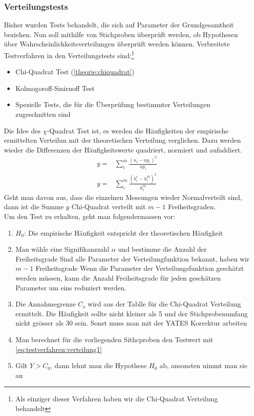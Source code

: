\subsubsection{Verteilungstests}
Bisher wurden Tests behandelt, die sich auf Parameter der Grundgesamtheit beziehen. Nun soll mithilfe von Stichproben überprüft werden, ob Hypothesen über Wahrscheinlichkeitsverteilungen überprüft werden können. Verbreitete Testverfahren in den Verteilungstests sind:\footnote{Als einziger dieser Verfahren haben wir die Chi-Quadrat Verteilung behandelt}
\begin{itemize}
\item Chi-Quadrat Test (\autoref{theorie:chiquadrat})
\item Kolmogoroff-Smirnoff Test
\item Spezielle Tests, die für die Überprüfung bestimmter Verteilungen zugeschnitten sind
\end{itemize}
Die Idee des $\chi$-Quadrat Test ist, es werden die Häufigkeiten der empirische ermittelten Verteilun mit der theoretischen Verteilung verglichen. Dazu werden wieder die Differenzen der Häufigkeitswerte quadriert, normiert und aufaddiert.
\begin{align}\label{eq:testverfahren:verteilung1}
y=&\sum_i^m \frac{\left(n_i - np_i\right)^2}{np_i}\\
y=&\sum_i^m \frac{\left(h_i^e-h_i^{th}\right)^2}{h_i^{th}}
\end{align}
Geht man davon aus, dass die einzelnen Messungen wieder Normalverteilt sind, dann ist die Summe $y$ Chi-Quadrat verteilt mit $m-1$ Freiheitsgraden.\\
Um den Test zu erhalten, geht man folgendermassen vor:
\begin{enumerate}
\item $H_0$: Die empirische Häufigkeit entspricht der theoretischen Häufigkeit
\item Man wähle eine Signifikanzzahl $\alpha$ und bestimme die Anzahl der Freiheitsgrade
\subitem Sind alle Parameter der Verteilungfunktion bekannt, haben wir $m-1$ Freiheitsgrade
\subitem Wenn die Parameter der Verteilungsfunktion geschätzt werden müssen, kann die Anzahl Freiheitsgrade für jeden geschätzen Parameter um eins reduziert werden.
\item Die Annahmegrenze $C_o$ wird aus der Tablle für die Chi-Quadrat Verteilung ermittelt. Die Häufigkeit sollte nicht kleiner als 5 und der Stichprobenumfang nicht grösser als 30 sein. Sonst muss man mit der YATES Korrektur arbeiten
\item Man berechnet für die vorliegenden Sithcproben den Testwert mit \autoref{eq:testverfahren:verteilung1}
\item Gilt $Y>C_0$, dann lehnt man die Hypothese $H_0$ ab, ansonsten nimmt man sie an
\end{enumerate}
